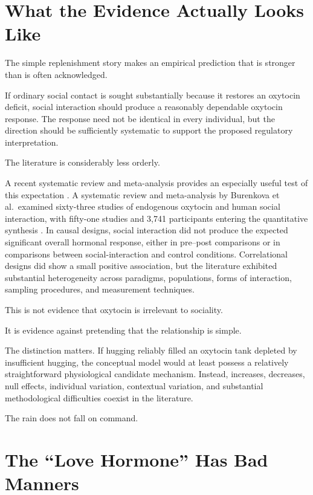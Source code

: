 \documentclass[12pt]{article}
\begin{document}
\section{What the Evidence Actually Looks Like}

The simple replenishment story makes an empirical prediction that is stronger than is often acknowledged.

If ordinary social contact is sought substantially because it restores an oxytocin deficit, social interaction should produce a reasonably dependable oxytocin response. The response need not be identical in every individual, but the direction should be sufficiently systematic to support the proposed regulatory interpretation.

The literature is considerably less orderly.

A recent systematic review and meta-analysis provides an especially useful test of this expectation \cite{burenkova2023endogenous}. A systematic review and meta-analysis by Burenkova et al.\ examined sixty-three studies of endogenous oxytocin and human social interaction, with fifty-one studies and 3{,}741 participants entering the quantitative synthesis \cite{burenkova2023endogenous}. In causal designs, social interaction did not produce the expected significant overall hormonal response, either in pre--post comparisons or in comparisons between social-interaction and control conditions. Correlational designs did show a small positive association, but the literature exhibited substantial heterogeneity across paradigms, populations, forms of interaction, sampling procedures, and measurement techniques.

This is not evidence that oxytocin is irrelevant to sociality.

It is evidence against pretending that the relationship is simple.

The distinction matters. If hugging reliably filled an oxytocin tank depleted by insufficient hugging, the conceptual model would at least possess a relatively straightforward physiological candidate mechanism. Instead, increases, decreases, null effects, individual variation, contextual variation, and substantial methodological difficulties coexist in the literature.

The rain does not fall on command.

\section{The ``Love Hormone'' Has Bad Manners}
\end{document}
